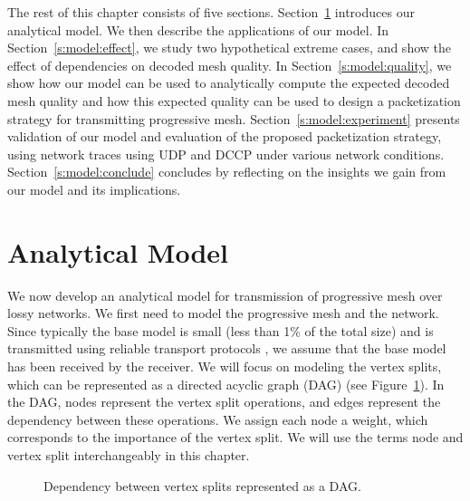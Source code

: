 
    The rest of this chapter consists of five sections. 
    Section~\ref{s:model:model} introduces our analytical model.
    We then describe the applications of our model.
    In Section~\ref{s:model:effect}, we study two hypothetical extreme
    cases, and show the effect of dependencies on
    decoded mesh quality.
    In Section~\ref{s:model:quality}, we show how our
    model can be used to analytically compute the expected
    decoded mesh quality and how this expected quality
    can be used to design a packetization strategy for transmitting
    progressive mesh.  Section~\ref{s:model:experiment} presents validation
    of our model and evaluation of the proposed packetization strategy,
    using network traces using UDP and DCCP under various
    network conditions.  
    Section~\ref{s:model:conclude} concludes by
    reflecting on the insights we gain from our model and its
    implications.

\section{Analytical Model}
\label{s:model:model}
    We now develop an analytical model for transmission of
    progressive mesh over lossy networks.  We first need to model
    the progressive mesh and the network.  Since typically
    the base model is small (less than 1\% of the total size) 
    and is transmitted using reliable
    transport protocols \cite{3tpregib}, we assume that the
    base model has been received by the
    receiver. We will focus on modeling the vertex splits,
    which can be represented as a directed acyclic graph (DAG)
    (see Figure~\ref{model:dag2}). In the DAG, nodes represent
    the vertex split operations, and edges represent the dependency
    between these operations. We assign each node a weight,
    which corresponds to the importance of the vertex split.
    We will use the terms node and vertex split interchangeably
    in this chapter.
\begin{figure}
\centering
{}
\caption{Dependency between vertex splits represented as a DAG.\label{model:dag2}}
\end{figure}


